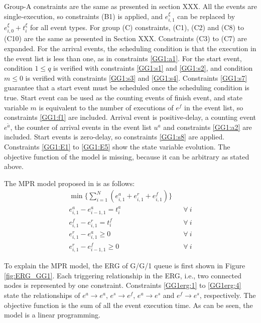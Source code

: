 \documentclass[]{interact}
\theoremstyle{plain}%
\theoremstyle{definition}
\theoremstyle{remark}
\begin{document}
Group-A constraints are the same as presented in section XXX. All the events are single-execution, so constraints (B1) is applied, and $e^{\xi}_{i,1}$ can be replaced by $e^{\xi}_{i,0}+t^{\xi}_i$ for all event types. For group (C) constraints, (C1), (C2) and (C8) to (C10) are the same as presented in Section XXX. Constraints (C3) to (C7) are expanded. For the arrival events, the scheduling condition is that the execution in the event list is less than one, as in constraints \eqref{GG1:a1}. For the start event, condition $1\le q$ is verified with constraints \eqref{GG1:s1} and \eqref{GG1:s2}, and condition $ m\le 0$ is verified with constraints \eqref{GG1:s3} and \eqref{GG1:s4}. Constraints \eqref{GG1:s7} guarantee that a start event must be scheduled once the scheduling condition is true. Start event can be used as the counting events of finish event, and state variable $m$ is equivalent to the number of executions of $e^{f}$ in the event list, so constraints \eqref{GG1:f1} are included. Arrival event is positive-delay, a counting event $e^{\tilde{a}}$, the counter of arrival events in the event list $u^a$ and constraints \eqref{GG1:a2} are included. Start events is zero-delay, so constraints \eqref{GG1:s8} are applied. Constraints \eqref{GG1:E1} to \eqref{GG1:E5} show the state variable evolution. The objective function of the model is missing, because it can be arbitrary as stated above.

The MPR model proposed in \cite{chan2008optimization} is as follows:
\begin{eqnarray}
\min\{\sum_{i=1}^N (e^{a}_{i,1}+e^{r}_{i,1}+e^{f}_{i,1})\}\nonumber\\
e^{a}_{i,1} - e^{a}_{i-1,1} = t^{a}_{i}&&\forall\ i \label{GG1erg:1}\\
e^{f}_{i,1} - e^{r}_{i,1} = t^{f}_{i}&&\forall\ i\label{GG1erg:2}\\
e^{r}_{i,1} - e^{a}_{i,1} \ge 0&&\forall\ i\label{GG1erg:3}\\
e^{r}_{i,1} - e^{f}_{i-1,1} \ge 0&&\forall\ i\label{GG1erg:4}
\end{eqnarray}

To explain the MPR model, the ERG of G/G/1 queue is first shown in Figure \ref{fig:ERG_GG1}. Each triggering relationship in the ERG, i.e., two connected nodes is represented by one constraint. Constraints \eqref{GG1erg:1} to \eqref{GG1erg:4} state the relationships of $e^a \rightarrow e^a$, $e^s\rightarrow e^f$, $e^a\rightarrow e^s$ and $e^f\rightarrow e^s$, respectively. The objective function is the sum of all the event execution time. As can be seen, the model is a linear programming. 
\end{document}
